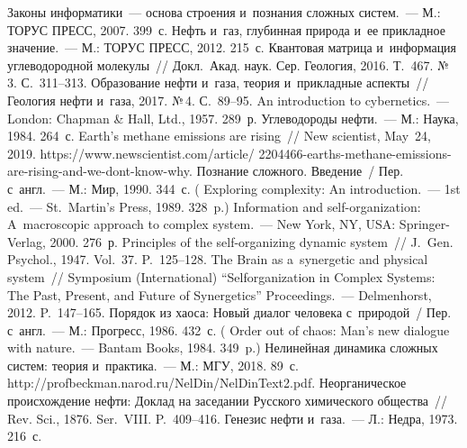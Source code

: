 \begin{multicols}{2}
    {\small\frenchspacing
 {%
 \begin{thebibliography}{99}
     Законы информатики~--- основа строения и~познания 
сложных систем.~--- М.: ТОРУС ПРЕСС, 2007. 399~с.
     Нефть и~газ, глубинная природа и~ее 
прикладное значение.~--- М.: ТОРУС ПРЕСС, 2012. 215~с.
     Квантовая матрица и~информация 
углеводородной молекулы~// Докл.\ Акад. наук. Сер. Геология, 2016. Т.~467. №\,3.  
С.~311--313.
     Образование нефти и~газа, тео\-рия 
и~прикладные аспекты~// Геология нефти и~газа, 2017. №\,4. С.~89--95.
     An introduction to cybernetics.~--- London: Chapman \& Hall, 
Ltd., 1957. 289~р.
     Углеводороды нефти.~--- М.: Наука, 1984. 264~с.
    Earth's methane emissions are rising~//
     New scientist, May~24, 2019. {\sf 
https://www.newscientist.com/article/ 2204466-earths-methane-emissions-are-rising-and-we-dont-know-why}.
     Познание сложного. Введение~/
    Пер. с~англ.~--- М.: Мир,  1990. 344~с.
    (  {Exploring 
complexity: An introduction}.~--- 1st ed.~--- St.\ Martin's Press, 1989. 328~p.)
     Information and self-organization: A~macroscopic approach to 
complex system.~--- New York, NY, USA: Springer-Verlag, 2000. 276~р.
     Principles of the self-organizing dynamic system~// J.~Gen. 
Psychol., 1947. Vol.~37. P.~125--128.
     The Brain as a~synergetic and physical system~// Symposium 
(International) ``Selforganization in Complex Systems: The Past, Present, and Future of 
Synergetics'' Proceedings.~--- Delmenhorst, 2012. P.~147--165.
     Порядок из хаоса: Новый диалог человека 
с~природой~/ Пер. с~англ.~--- М.: Прогресс, 1986. 432~с.
( {Order out of chaos: Man's
new dialogue with nature}.~--- Bantam Books, 1984. 349~p.)
     Нелинейная динамика сложных систем: теория 
и~практика.~--- М.: МГУ, 2018. 89~с.
{\sf 
http://\linebreak profbeckman.narod.ru/NelDin/NelDinText2.pdf}.
     Неорганическое происхождение нефти: Доклад на 
заседании Русского химического общества~// Rev. Sci., 1876. Ser.~VIII. 
P.~409--416.
     Генезис нефти и~газа.~--- Л.: Недра, 1973. 216~с.
     \end{thebibliography}

 }
 }

\end{multicols}

